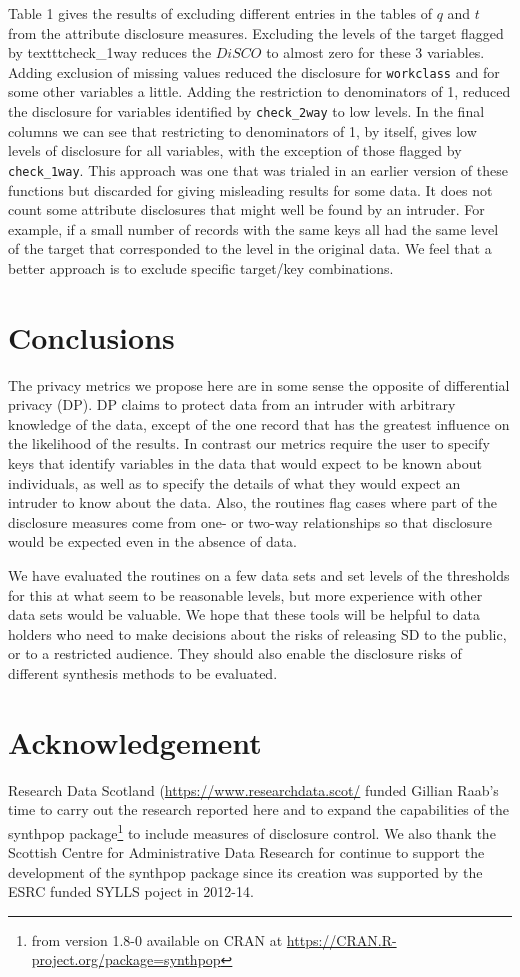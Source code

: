 \documentclass[12pt]{article}
\begin{document}
Table 1 gives the results of excluding different entries in the tables of $q$ and $t$ from the attribute disclosure measures.
Excluding the levels of the target flagged by texttt{check\_1way} reduces the $DiSCO$ to almost zero for these 3 variables.
Adding exclusion of missing values reduced the disclosure for \texttt{workclass} and for some other variables a little. 
Adding the restriction to denominators of 1, reduced the disclosure for variables identified by \texttt{check\_2way} to low 
levels. In the final columns we can see that restricting to denominators of 1, by itself, gives low levels of disclosure for
all variables, with the exception of those flagged by \texttt{check\_1way}. This approach was one that was trialed in an earlier 
version of these functions but discarded for giving misleading results for some data. It does not count some attribute disclosures that might well be found by an intruder. For example, if a small number of records with the same keys all had the same level of the target that
corresponded to the level in the original data. We feel that a better approach is to exclude specific target/key combinations.

\section{Conclusions}
The privacy metrics we propose here are in some sense the opposite of differential privacy (DP).
DP claims to protect data from an intruder with arbitrary knowledge of the data, except of
the one record that has the greatest influence on the likelihood of the results. In contrast our metrics require the user to specify keys that identify variables in the data
that would expect to be known about individuals, as well as to 
specify the details of what they would expect an intruder 
to know about the data.  Also, the routines flag cases where part of the
disclosure measures come from one- or two-way relationships so that disclosure would be
expected even in the absence of data. 

We have evaluated the routines on a few data sets
and set levels of the thresholds for this at what seem to be reasonable levels, but 
more experience with other data sets would be valuable. 
We hope that these tools will be helpful to data holders who need to make decisions 
about the risks of releasing SD to the public, or to a restricted audience.
They should also enable the disclosure risks of different synthesis methods to be evaluated.


\section{Acknowledgement}
Research Data Scotland (\url{https://www.researchdata.scot/} funded Gillian Raab's time to carry 
out the research reported here and  to expand the capabilities of the synthpop package\footnote{
from version 1.8-0 available on CRAN at \url{https://CRAN.R-project.org/package=synthpop}
}
to include measures of disclosure control. We also thank the Scottish Centre for Administrative 
Data Research for continue to support the development of the synthpop package since its creation was
supported by the ESRC funded SYLLS poject in 2012-14.
\end{document}
